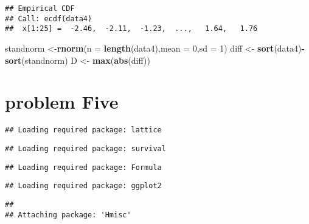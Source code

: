 \documentclass[]{article}
\newenvironment{Shaded}{\begin{snugshade}}{\end{snugshade}}
\newcommand{\KeywordTok}[1]{\textcolor[rgb]{0.13,0.29,0.53}{\textbf{#1}}}
\newcommand{\DataTypeTok}[1]{\textcolor[rgb]{0.13,0.29,0.53}{#1}}
\newcommand{\DecValTok}[1]{\textcolor[rgb]{0.00,0.00,0.81}{#1}}
\newcommand{\StringTok}[1]{\textcolor[rgb]{0.31,0.60,0.02}{#1}}
\newcommand{\OperatorTok}[1]{\textcolor[rgb]{0.81,0.36,0.00}{\textbf{#1}}}
\newcommand{\NormalTok}[1]{#1}
\begin{document}
\begin{verbatim}
## Empirical CDF 
## Call: ecdf(data4)
##  x[1:25] =  -2.46,  -2.11,  -1.23,  ...,   1.64,   1.76
\end{verbatim}

\begin{Shaded}
\begin{Highlighting}[]
\NormalTok{standnorm <-}\KeywordTok{rnorm}\NormalTok{(}\DataTypeTok{n =} \KeywordTok{length}\NormalTok{(data4),}\DataTypeTok{mean =} \DecValTok{0}\NormalTok{,}\DataTypeTok{sd =} \DecValTok{1}\NormalTok{)}
\NormalTok{diff <-}\StringTok{ }\KeywordTok{sort}\NormalTok{(data4)}\OperatorTok{-}\KeywordTok{sort}\NormalTok{(standnorm)}
\NormalTok{D <-}\StringTok{ }\KeywordTok{max}\NormalTok{(}\KeywordTok{abs}\NormalTok{(diff))}
\end{Highlighting}
\end{Shaded}

\section{problem Five}\label{problem-five}

\begin{Shaded}
\end{Shaded}

\begin{verbatim}
## Loading required package: lattice
\end{verbatim}

\begin{verbatim}
## Loading required package: survival
\end{verbatim}

\begin{verbatim}
## Loading required package: Formula
\end{verbatim}

\begin{verbatim}
## Loading required package: ggplot2
\end{verbatim}

\begin{verbatim}
## 
## Attaching package: 'Hmisc'
\end{verbatim}
\end{document}
